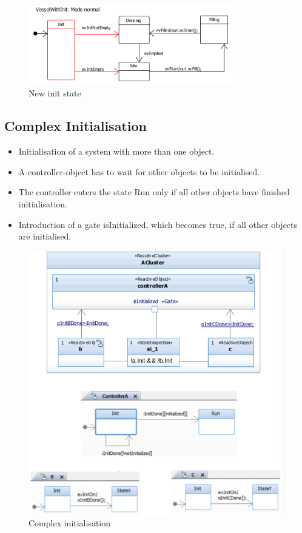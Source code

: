 \begin{figure}[H]
\centering
\includegraphics[width=0.8\textwidth]{figures/developmentReactiveMachineModelInit.png}
\caption{New init state}
\end{figure}

\hypertarget{complex-initialisation}{%
\subsection{Complex Initialisation}\label{complex-initialisation}}

\begin{itemize}
\tightlist
\item
  Initialisation of a system with more than one object.
\item
  A controller-object has to wait for other objects to be initialised.
\item
  The controller enters the state Run only if all other objects have
  finished initialisation.
\item
  Introduction of a gate isInitialized, which becomes true, if all other
  objects are initialised.
\end{itemize}

\begin{figure}[H]
\centering
\includegraphics[width=1\textwidth]{figures/developmentReactiveMachineModelInit2.png}
\caption{Complex initialisation}
\end{figure}
